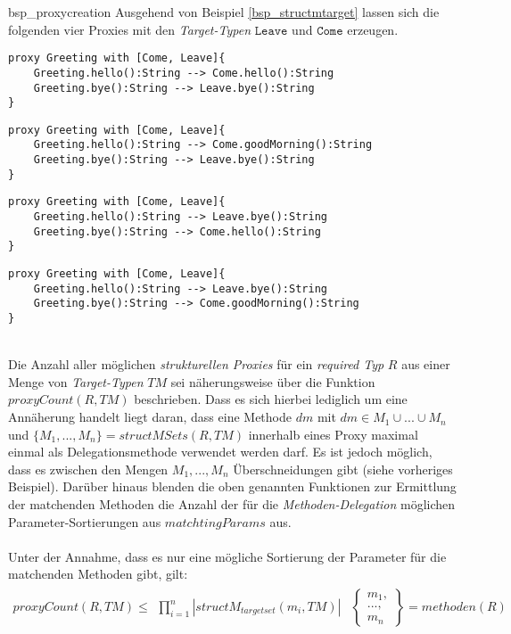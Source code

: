 \begin{example}{bsp_proxycreation}
Ausgehend von Beispiel \ref{bsp_structmtarget} lassen sich die folgenden vier Proxies mit den \emph{Target-Typen} $\texttt{Leave}$ und $\texttt{Come}$ erzeugen.
\begin{lstlisting}[style = dsl]
proxy Greeting with [Come, Leave]{
	Greeting.hello():String --> Come.hello():String
	Greeting.bye():String --> Leave.bye():String
}
\end{lstlisting}
\begin{lstlisting}[style = dsl]
proxy Greeting with [Come, Leave]{
	Greeting.hello():String --> Come.goodMorning():String
	Greeting.bye():String --> Leave.bye():String
}
\end{lstlisting}
\begin{lstlisting}[style = dsl]
proxy Greeting with [Come, Leave]{
	Greeting.hello():String --> Leave.bye():String
	Greeting.bye():String --> Come.hello():String
}
\end{lstlisting}
\begin{lstlisting}[style = dsl]
proxy Greeting with [Come, Leave]{
	Greeting.hello():String --> Leave.bye():String
	Greeting.bye():String --> Come.goodMorning():String
}
\end{lstlisting}
\end{example}
\noindent
\\
Die Anzahl aller möglichen \emph{strukturellen Proxies} für ein \emph{required Typ} $R$ aus einer Menge von \emph{Target-Typen} $\mathit{TM}$ sei näherungsweise über die Funktion $\mathit{proxyCount(R,\mathit{TM})}$ beschrieben. Dass es sich hierbei lediglich um eine Annäherung handelt liegt daran, dass eine Methode $\mathit{dm}$ mit $\mathit{dm} \in M_1 \cup ... \cup M_n$ und $\{M_1,...,M_n\} = \mathit{structMSets(R,TM)}$ innerhalb eines Proxy maximal einmal als Delegationsmethode verwendet werden darf. Es ist jedoch möglich, dass es zwischen den Mengen 
$M_1,...,M_n$ Überschneidungen gibt (siehe vorheriges Beispiel). Darüber hinaus blenden die oben genannten Funktionen zur Ermittlung der matchenden Methoden die Anzahl der für die \emph{Methoden-Delegation} möglichen Parameter-Sortierungen aus $\mathit{matchtingParams}$ aus.
\\\\
Unter der Annahme, dass es nur eine mögliche Sortierung der Parameter für die matchenden Methoden gibt, gilt:
\begin{gather*}
\mathit{proxyCount(R,TM)} \leq 
\begin{array}{l|l}
\prod\limits_{i=1}^{n}|\mathit{structM_{targetset}(m_i, TM)}|
&
\left\{
\begin{array}{l}
m_1,\\
...,\\
m_n
\end{array}
\right\}
= \mathit{methoden(R)}
\end{array}
\end{gather*}
